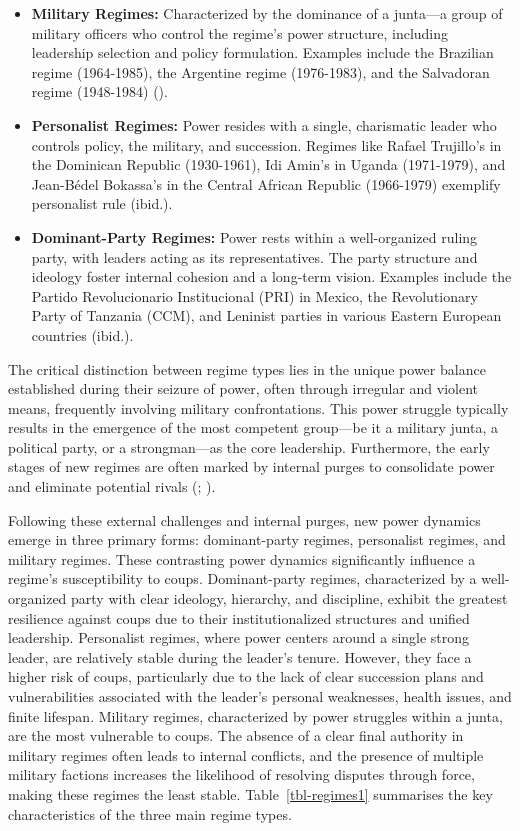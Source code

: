 \documentclass[
  12pt,
]{report}
\begin{document}
\begin{itemize}
\item
  \textbf{Military Regimes:} Characterized by the dominance of a
  junta---a group of military officers who control the regime's power
  structure, including leadership selection and policy formulation.
  Examples include the Brazilian regime (1964-1985), the Argentine
  regime (1976-1983), and the Salvadoran regime (1948-1984)
  ().
\item
  \textbf{Personalist Regimes:} Power resides with a single, charismatic
  leader who controls policy, the military, and succession. Regimes like
  Rafael Trujillo's in the Dominican Republic (1930-1961), Idi Amin's in
  Uganda (1971-1979), and Jean-Bédel Bokassa's in the Central African
  Republic (1966-1979) exemplify personalist rule (ibid.).
\item
  \textbf{Dominant-Party Regimes:} Power rests within a well-organized
  ruling party, with leaders acting as its representatives. The party
  structure and ideology foster internal cohesion and a long-term
  vision. Examples include the Partido Revolucionario Institucional
  (PRI) in Mexico, the Revolutionary Party of Tanzania (CCM), and
  Leninist parties in various Eastern European countries (ibid.).
\end{itemize}

The critical distinction between regime types lies in the unique power
balance established during their seizure of power, often through
irregular and violent means, frequently involving military
confrontations. This power struggle typically results in the emergence
of the most competent group---be it a military junta, a political party,
or a strongman---as the core leadership. Furthermore, the early stages
of new regimes are often marked by internal purges to consolidate power
and eliminate potential rivals (; ).

Following these external challenges and internal purges, new power
dynamics emerge in three primary forms: dominant-party regimes,
personalist regimes, and military regimes. These contrasting power
dynamics significantly influence a regime's susceptibility to coups.
Dominant-party regimes, characterized by a well-organized party with
clear ideology, hierarchy, and discipline, exhibit the greatest
resilience against coups due to their institutionalized structures and
unified leadership. Personalist regimes, where power centers around a
single strong leader, are relatively stable during the leader's tenure.
However, they face a higher risk of coups, particularly due to the lack
of clear succession plans and vulnerabilities associated with the
leader's personal weaknesses, health issues, and finite lifespan.
Military regimes, characterized by power struggles within a junta, are
the most vulnerable to coups. The absence of a clear final authority in
military regimes often leads to internal conflicts, and the presence of
multiple military factions increases the likelihood of resolving
disputes through force, making these regimes the least stable.
Table~\ref{tbl-regimes1} summarises the key characteristics of the three
main regime types.
\end{document}
